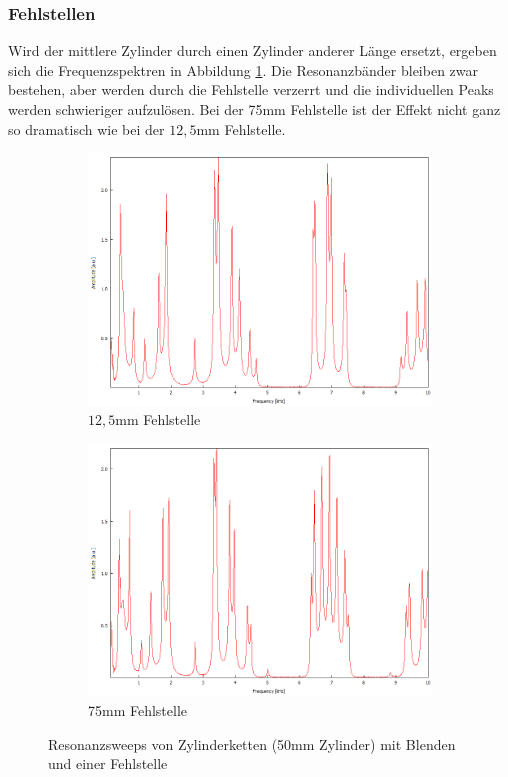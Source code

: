 \subsubsection{Fehlstellen}
Wird der mittlere Zylinder durch einen Zylinder anderer Länge ersetzt, ergeben sich die Frequenzspektren in Abbildung \ref{fig:zylinder_fehlstellen}.
Die Resonanzbänder bleiben zwar bestehen, aber werden durch die Fehlstelle verzerrt und die individuellen Peaks werden schwieriger aufzulösen.
Bei der 75mm Fehlstelle ist der Effekt nicht ganz so dramatisch wie bei der $12,5$mm Fehlstelle.
\begin{figure}
  \centering
  \begin{subfigure}{0.4\textwidth}
    \centering
    \includegraphics[width=\textwidth]{Bilder/Zylinderketten/unrein_12,5mm_mitte_doppel.png}
    \caption{$12,5$mm Fehlstelle}
  \end{subfigure}
  \begin{subfigure}{0.4\textwidth}
    \centering
    \includegraphics[width=\textwidth]{Bilder/Zylinderketten/unrein_75mm_mitte_doppel_7.png}
    \caption{75mm Fehlstelle}
  \end{subfigure}
  \caption{Resonanzsweeps von Zylinderketten (50mm Zylinder) mit Blenden und einer Fehlstelle}
  \label{fig:zylinder_fehlstellen}
\end{figure}